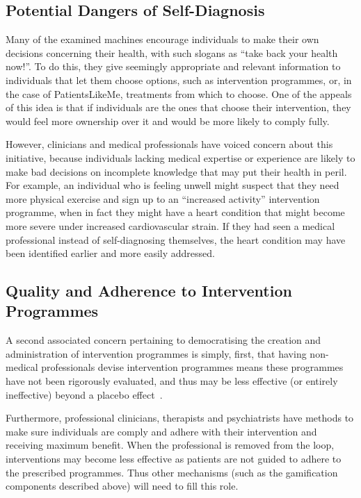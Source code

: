 \documentclass{sig-alternate}
\begin{document}
\subsection{Potential Dangers of Self-Diagnosis}

Many of the examined machines encourage individuals to make their own
decisions concerning their health, with such slogans as ``take back
your health now!''.  To do this, they give seemingly appropriate and
relevant information to individuals that let them choose options, such
as intervention programmes, or, in the case of PatientsLikeMe,
treatments from which to choose.  One of the appeals of this idea is
that if individuals are the ones that choose their intervention, they
would feel more ownership over it and would be more likely to comply
fully.

However, clinicians and medical professionals have voiced concern
about this initiative, because individuals lacking medical expertise or
experience are likely to make bad decisions on incomplete knowledge
that may put their health in peril.  For example, an individual who is
feeling unwell might suspect that they need more physical exercise and
sign up to an ``increased activity'' intervention programme, when in
fact they might have a heart condition that might become more severe
under increased cardiovascular strain.  If they had seen a medical
professional instead of self-diagnosing themselves, the heart
condition may have been identified earlier and more easily addressed.

\subsection{Quality and Adherence to Intervention Programmes}

A second associated concern pertaining to democratising the creation
and administration of intervention programmes is simply, first, that
having non-medical professionals devise intervention programmes means
these programmes have not been rigorously evaluated, and thus may be
less effective (or entirely ineffective) beyond a placebo effect~\cite{placeboeffect}.  

Furthermore, professional clinicians, therapists and psychiatrists
have methods to make sure individuals are comply and adhere with their
intervention and receiving maximum benefit.  When the professional is
removed from the loop, interventions may become less effective as
patients are not guided to adhere to the prescribed programmes. Thus
other mechanisms (such as the gamification components described above)
will need to fill this role.
\end{document}
